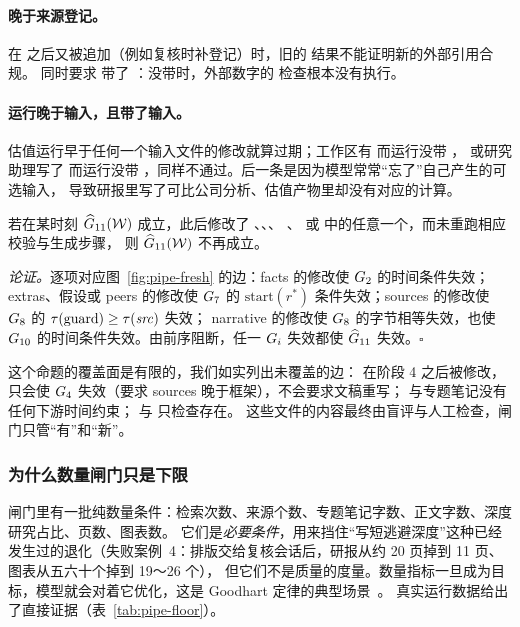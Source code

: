 \paragraph{ 晚于来源登记。} 在  之后又被追加（例如复核时补登记）时，旧的  结果不能证明新的外部引用合规。
同时要求  带了 ：没带时，外部数字的 \code{[S编号]} 检查根本没有执行。

\paragraph{运行晚于输入，且带了输入。}估值运行早于任何一个输入文件的修改就算过期；工作区有  而运行没带 ，
或研究助理写了  而运行没带 ，同样不通过。后一条是因为模型常常“忘了”自己产生的可选输入，
导致研报里写了可比公司分析、估值产物里却没有对应的计算。

\begin{proposition}[过期传播]\label{prop:pipe-stale}
若在某时刻 $\widehat{G}_{11}(\mathcal{W})$ 成立，此后修改了 、、、
、 或  中的任意一个，而未重跑相应校验与生成步骤，
则 $\widehat{G}_{11}(\mathcal{W})$ 不再成立。
\end{proposition}

\noindent\textit{论证。}逐项对应图~\ref{fig:pipe-fresh} 的边：facts 的修改使 $G_{2}$ 的时间条件失效；
extras、假设或 peers 的修改使 $G_{7}$ 的 $\mathrm{start}(r^\ast)$ 条件失效；sources 的修改使 $G_{8}$ 的 $\tau(\mathrm{guard})\ge\tau(\mathit{src})$ 失效；
narrative 的修改使 $G_{8}$ 的字节相等失效，也使 $G_{10}$ 的时间条件失效。由前序阻断，任一 $G_{i}$ 失效都使 $\widehat{G}_{11}$ 失效。$\square$

这个命题的覆盖面是有限的，我们如实列出未覆盖的边：
 在阶段 4 之后被修改，只会使 $G_{4}$ 失效（要求 sources 晚于框架），不会要求文稿重写；
 与专题笔记没有任何下游时间约束； 与  只检查存在。
这些文件的内容最终由盲评与人工检查，闸门只管“有”和“新”。

\subsubsection{为什么数量闸门只是下限}

闸门里有一批纯数量条件：检索次数、来源个数、专题笔记字数、正文字数、深度研究占比、页数、图表数。
它们是\emph{必要条件}，用来挡住“写短逃避深度”这种已经发生过的退化（失败案例~4：排版交给复核会话后，研报从约 20 页掉到 11 页、图表从五六十个掉到 19～26 个），
但它们不是质量的度量。数量指标一旦成为目标，模型就会对着它优化，这是 Goodhart 定律的典型场景~\citep{goodhart1975problems,strathern1997improving}。
真实运行数据给出了直接证据（表~\ref{tab:pipe-floor}）。

